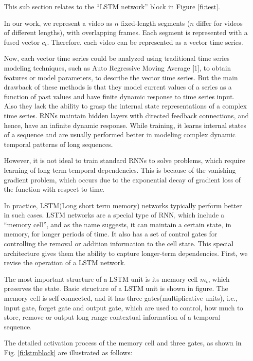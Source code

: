 This sub section relates to
the ``LSTM network'' block in Figure \ref{fi:test}.

In our work, we represent a video as $n$
fixed-length segments ($n$ differ for videos of different lengths),  with overlapping frames.  Each segment
is represented with a fused vector $c_{t}$. Therefore, each video can be represented as a vector time series.


Now, each vector time series could be  analyzed using traditional time series modeling techniques,
such as Auto Regressive Moving Average [1], to obtain features or model parameters, to describe the
vector time series.
But the main drawback of these methods is that they model current values of a series as a function of past values
and have finite dynamic response to time series input. Also they lack the ability to grasp the internal state
representations of a complex time series. RNNs maintain hidden layers with directed feedback connections, and hence,
have an infinite dynamic response. While training, it learns internal states of a sequence
and are usually performed better in modeling complex dynamic temporal patterns of long sequences.


However, it is not ideal to train standard RNNs to solve problems,
which require learning of long-term temporal dependencies. This is because of the vanishing-gradient problem, which occurs
due to the exponential decay of gradient loss of the function with respect to time.

In practice, LSTM(Long short term memory) networks typically perform better in such cases.
LSTM networks are a special type of RNN, which include a ``memory cell'', and as the name suggests,
it can maintain a certain state, in memory, for longer periods of time.
It also has a set of control gates for controlling the removal or addition information to the cell state.
This special architecture gives them the ability to capture longer-term dependencies. First, we revise the operation of a LSTM
network.

The most important structure of a LSTM unit is its memory cell $m_{t}$, which preserves the state. Basic structure of a LSTM
unit is shown in figure. The memory cell is self connected, and it has three gates(multiplicative units), i.e., input gate, forget gate and
output gate, which are used to control, how much to store, remove or output long range contextual information of a temporal sequence.

The detailed activation process of the memory cell and three gates, as shown in Fig. \ref{fi:lstmblock} are
illustrated as follows:



